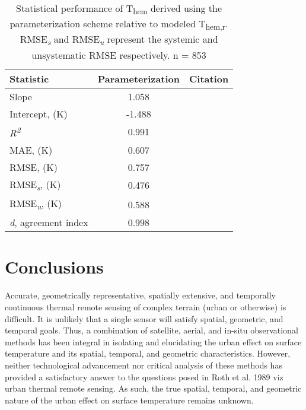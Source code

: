 \begin{bibunit}
\begin{table}[H]
 	\centering
 	\caption{Statistical performance of T\textsubscript{hem} derived using the parameterization scheme relative to modeled T\textsubscript{hem,r}. RMSE\textit{\textsubscript{s}} and RMSE\textit{\textsubscript{u}} represent the systemic and unsystematic RMSE respectively. n = 853}
 	\label{parastats}
 	\begin{tabular}{lcl}
 		\toprule 
 		Statistic & Parameterization & Citation \\  \midrule
 		Slope & 1.058 &  \\ 
 		Intercept, (\si{\kelvin}) & -1.488 &   \\ 
 		\textit{R\textsuperscript{2}} & 0.991 & \\ 
 		MAE,  (\si{\kelvin}) & 0.607& \citep{Willmott1985a} \\ 
 		RMSE,  (\si{\kelvin}) & 0.757 & \citep{Willmott1985a} \\ 
 		RMSE\textit{\textsubscript{s}},  (\si{\kelvin}) & 0.476  & \citep{Willmott1985a} \\ 
 		RMSE\textit{\textsubscript{u}},  (\si{\kelvin}) & 0.588  & \citep{Willmott1985a} \\ 
 		\textit{d}, agreement index & 0.998 & \citep{Willmott2012} \\
 		\bottomrule
 	\end{tabular} 
\end{table}
 
 \section{Conclusions}
 
Accurate, geometrically representative, spatially extensive, and temporally continuous thermal remote sensing of complex terrain (urban or otherwise) is difficult. It is unlikely that a single sensor will satisfy spatial, geometric, and temporal goals. Thus, a combination of satellite, aerial, and in-situ observational methods has been integral in isolating and elucidating the urban effect on surface temperature and its spatial, temporal, and geometric characteristics. However, neither technological advancement nor critical analysis of these methods has provided a satisfactory answer to the questions posed in Roth et al. 1989 viz urban thermal remote sensing. As such, the true spatial, temporal, and geometric nature of the urban effect on surface temperature remains unknown. 
 

\end{bibunit}
